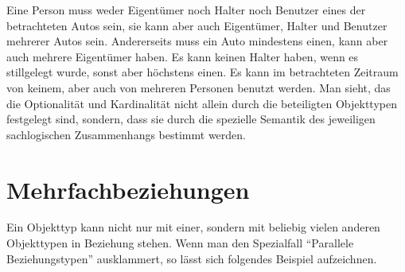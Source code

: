         Eine Person muss weder Eigentümer noch Halter noch Benutzer eines der betrachteten Autos sein, sie kann aber auch Eigentümer, Halter und Benutzer mehrerer Autos sein. Andererseits muss ein Auto mindestens einen, kann aber auch mehrere Eigentümer haben. Es kann keinen Halter haben, wenn es stillgelegt wurde, sonst aber höchstens einen. Es kann im betrachteten Zeitraum von keinem, aber auch von mehreren Personen benutzt werden. Man sieht, das die Optionalität und Kardinalität nicht allein durch die beteiligten Objekttypen festgelegt sind, sondern, dass sie durch die spezielle Semantik des jeweiligen sachlogischen Zusammenhangs bestimmt werden.
        \begin{center}
        \end{center}

      \section{Mehrfachbeziehungen}
        Ein Objekttyp kann nicht nur mit einer, sondern mit beliebig vielen anderen Objekttypen in Beziehung stehen. Wenn man den Spezialfall \enquote{Parallele Beziehungstypen} ausklammert, so lässt sich folgendes Beispiel aufzeichnen.

